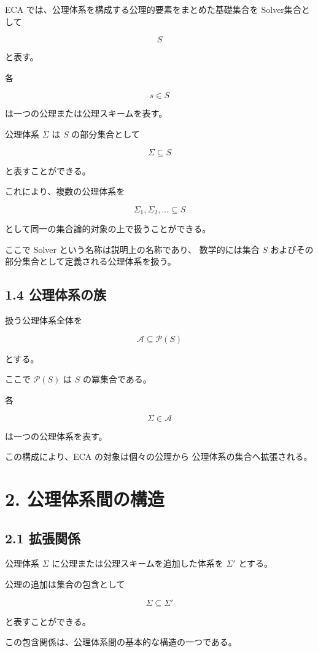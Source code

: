 \documentclass[11pt]{article}
\begin{document}
ECA では、公理体系を構成する公理的要素をまとめた基礎集合を
Solver集合として

\[
S
\]

と表す。

各

\[
s\in S
\]

は一つの公理または公理スキームを表す。

公理体系 $\Sigma$ は $S$ の部分集合として

\[
\Sigma\subseteq S
\]

と表すことができる。

これにより、複数の公理体系を

\[
\Sigma_1,\Sigma_2,\ldots\subseteq S
\]

として同一の集合論的対象の上で扱うことができる。

ここで Solver という名称は説明上の名称であり、
数学的には集合 $S$ およびその部分集合として定義される公理体系を扱う。

\subsection{1.4 公理体系の族}

扱う公理体系全体を

\[
\mathscr{A}\subseteq\mathcal{P}(S)
\]

とする。

ここで $\mathcal{P}(S)$ は $S$ の冪集合である。

各

\[
\Sigma\in\mathscr{A}
\]

は一つの公理体系を表す。

この構成により、ECA の対象は個々の公理から
公理体系の集合へ拡張される。

\section{2. 公理体系間の構造}

\subsection{2.1 拡張関係}

公理体系 $\Sigma$ に公理または公理スキームを追加した体系を
$\Sigma'$ とする。

公理の追加は集合の包含として

\[
\Sigma\subseteq\Sigma'
\]

と表すことができる。

この包含関係は、公理体系間の基本的な構造の一つである。
\end{document}
